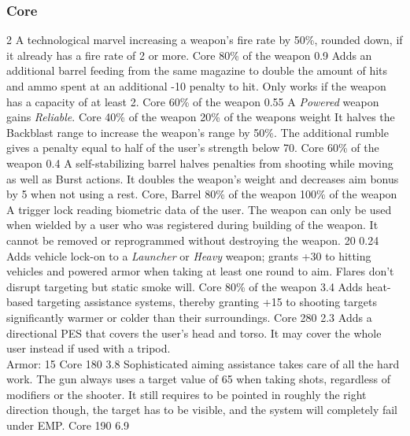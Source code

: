 \subsubsection{Core}
\vspace{8mm}
\begin{multicols}{2}
    {A technological marvel increasing a weapon's fire rate by 50\%,
        rounded down, if it already has a fire rate of 2 or more.}
    {Core}
    {80\% of the weapon}
    {0.9}
    {Adds an additional barrel feeding from the same magazine
        to double the amount of hits and ammo spent at an additional -10 penalty to hit.
        Only works if the weapon has a capacity of at least 2.}
    {Core}
    {60\% of the weapon}
    {0.55}
    {A \emph{Powered} weapon gains \emph{Reliable}.}
    {Core}
    {40\% of the weapon}
    {20\% of the weapons weight}
    {It halves the Backblast range to increase the weapon's range by 50\%.
        The additional rumble gives a penalty equal to half of the user's strength below 70.}
    {Core}
    {60\% of the weapon}
    {0.4}
    {A self-stabilizing barrel halves penalties from shooting while moving as well as Burst actions.
        It doubles the weapon's weight and decreases aim bonus by 5 when not using a rest.}
    {Core, Barrel}
    {80\% of the weapon}
    {100\% of the weapon}
    {A trigger lock reading biometric data of the user.
        The weapon can only be used when wielded by a user
        who was registered during building of the weapon.
        It cannot be removed or reprogrammed without destroying the weapon.}
    {}
    {20}
    {0.24}
    {Adds vehicle lock-on to a \emph{Launcher} or \emph{Heavy} weapon;
        grants +30 to hitting vehicles and powered armor
        when taking at least one round to aim.
        Flares don't disrupt targeting but static smoke will.}
    {Core}
    {80\% of the weapon}
    {3.4}
    {Adds heat-based targeting assistance systems,
        thereby granting +15 to shooting targets significantly warmer or colder than their surroundings.}
    {Core}
    {280}
    {2.3}
    {Adds a directional PES that covers the user's head and torso.
	It may cover the whole user instead if used with a tripod.\\
	Armor: 15}
    {Core}
    {180}
    {3.8}
    {Sophisticated aiming assistance takes care of all the hard work.
        The gun always uses a target value of 65 when taking shots,
        regardless of modifiers or the shooter.
        It still requires to be pointed in roughly the right direction though,
        the target has to be visible,
        and the system will completely fail under EMP.
    }
     {Core}
     {190}
     {6.9}
\end{multicols}


